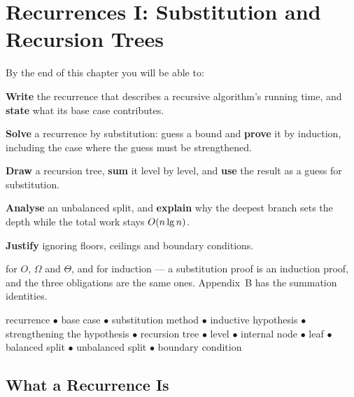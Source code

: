 \chapter{Recurrences I: Substitution and Recursion Trees}\label{ch:recurrences}

\begin{outcomes}
By the end of this chapter you will be able to:
\begin{tight}
  \item \textbf{Write} the recurrence that describes a recursive algorithm's
        running time, and \textbf{state} what its base case contributes.
  \item \textbf{Solve} a recurrence by substitution: guess a bound and
        \textbf{prove} it by induction, including the case where the guess must
        be strengthened.
  \item \textbf{Draw} a recursion tree, \textbf{sum} it level by level, and
        \textbf{use} the result as a guess for substitution.
  \item \textbf{Analyse} an unbalanced split, and \textbf{explain} why the
        deepest branch sets the depth while the total work stays
        $O(n \operatorname{lg} n)$.
  \item \textbf{Justify} ignoring floors, ceilings and boundary conditions.
\end{tight}
\end{outcomes}

\begin{prereq}
 for $O$, $\Omega$ and $\Theta$, and  for
induction --- a substitution proof is an induction proof, and the three
obligations are the same ones. Appendix~B has the summation identities.
\end{prereq}

\begin{keyterms}
recurrence $\bullet$ base case $\bullet$ substitution method $\bullet$
inductive hypothesis $\bullet$ strengthening the hypothesis $\bullet$
recursion tree $\bullet$ level $\bullet$ internal node $\bullet$ leaf
$\bullet$ balanced split $\bullet$ unbalanced split $\bullet$ boundary
condition
\end{keyterms}

\section{What a Recurrence Is}

